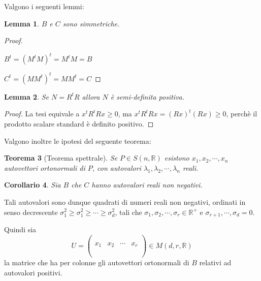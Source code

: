 \documentclass[12pt,a4paper]{article}
\theoremstyle{thm}
\newtheorem{theorem}{Teorema}[section]
\newtheorem{lemma}[theorem]{Lemma}
\newtheorem{corollary}[theorem]{Corollario}
\theoremstyle{def}
\begin{document}
Valgono i seguenti lemmi:

\begin{lemma}
$B$ e $C$ sono simmetriche.
\end{lemma}

\begin{proof}~

$B^t = (M^tM)^t = M^tM = B$

$C^t = (MM^t)^t = MM^t = C$ 
\end{proof}

\begin{lemma}
Se $N = R^t R$ allora $N$ è semi-definita positiva.
\end{lemma}
\begin{proof}
La tesi equivale a $x^tR^tRx \ge 0$, ma $x^tR^tRx = (Rx)^t (Rx) \ge 0$, perchè il prodotto scalare standard è definito positivo. 
\end{proof}

\vspace{0.5cm}

Valgono inoltre le ipotesi del seguente teorema:

\begin{theorem}[Teorema spettrale]
Se $P \in S(n, \mathds{R})$ esistono $ x_1, x_2, \cdots, x_n$ autovettori ortonormali di $P$, con autovalori $\lambda_1, \lambda_2, \cdots, \lambda_n$ reali.
\end{theorem}


\begin{corollary}
Sia $B$ che $C$ hanno autovalori reali non negativi.
\end{corollary}

\vspace{0.5cm}

Tali autovalori sono dunque quadrati di numeri reali non negativi, ordinati in senso decrescente $\sigma_1^2 \ge \sigma_1^2 \ge \cdots \ge \sigma_d^2$, tali che
$\sigma_1, \sigma_2, \cdots, \sigma_r \in \mathds{R}^+$ e $\sigma_{r+1}, \cdots, \sigma_d = 0$.


Quindi sia $$U = \left(\begin{array}{c|c|c|c} & & & \\ & & & \\ x_1 & x_2 & \cdots& x_r\\ & & & \\ & & & \\ \end{array}\right) \in M(d,r, \mathds{R})$$ la matrice che ha per colonne gli autovettori ortonormali di $B$ relativi ad autovalori positivi.
\end{document}
